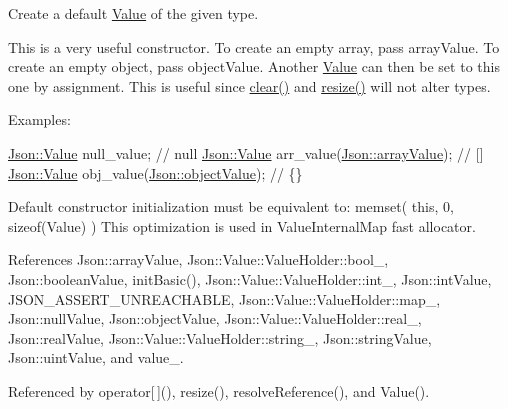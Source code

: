 Create a default \hyperlink{classJson_1_1Value}{Value} of the given type. 

This is a very useful constructor. To create an empty array, pass array\+Value. To create an empty object, pass object\+Value. Another \hyperlink{classJson_1_1Value}{Value} can then be set to this one by assignment. This is useful since \hyperlink{classJson_1_1Value_a501a4d67e6c875255c2ecc03ccd2019b_a501a4d67e6c875255c2ecc03ccd2019b}{clear()} and \hyperlink{classJson_1_1Value_aa284353271ada427dbfa04a42f2be407_aa284353271ada427dbfa04a42f2be407}{resize()} will not alter types. \begin{DoxyVerb}Examples:
\end{DoxyVerb}
 
\begin{DoxyCode}
\hyperlink{classJson_1_1Value}{Json::Value} null\_value; \textcolor{comment}{// null}
\hyperlink{classJson_1_1Value}{Json::Value} arr\_value(\hyperlink{namespaceJson_a7d654b75c16a57007925868e38212b4e_a7d654b75c16a57007925868e38212b4eadc8f264f36b55b063c78126b335415f4}{Json::arrayValue}); \textcolor{comment}{// []}
\hyperlink{classJson_1_1Value}{Json::Value} obj\_value(\hyperlink{namespaceJson_a7d654b75c16a57007925868e38212b4e_a7d654b75c16a57007925868e38212b4eae8386dcfc36d1ae897745f7b4f77a1f6}{Json::objectValue}); \textcolor{comment}{// \{\}}
\end{DoxyCode}
Default constructor initialization must be equivalent to\+: memset( this, 0, sizeof(\+Value) ) This optimization is used in Value\+Internal\+Map fast allocator. 

References Json\+::array\+Value, Json\+::\+Value\+::\+Value\+Holder\+::bool\+\_\+, Json\+::boolean\+Value, init\+Basic(), Json\+::\+Value\+::\+Value\+Holder\+::int\+\_\+, Json\+::int\+Value, J\+S\+O\+N\+\_\+\+A\+S\+S\+E\+R\+T\+\_\+\+U\+N\+R\+E\+A\+C\+H\+A\+B\+LE, Json\+::\+Value\+::\+Value\+Holder\+::map\+\_\+, Json\+::null\+Value, Json\+::object\+Value, Json\+::\+Value\+::\+Value\+Holder\+::real\+\_\+, Json\+::real\+Value, Json\+::\+Value\+::\+Value\+Holder\+::string\+\_\+, Json\+::string\+Value, Json\+::uint\+Value, and value\+\_\+.



Referenced by operator\mbox{[}$\,$\mbox{]}(), resize(), resolve\+Reference(), and Value().

\mbox{\label{classJson_1_1Value_a4744ae571fcf34f4b16a2257b3b3b585_a4744ae571fcf34f4b16a2257b3b3b585}} 
